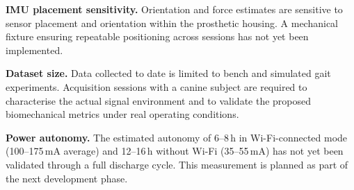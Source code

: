 \textbf{IMU placement sensitivity.}
Orientation and force estimates are sensitive to sensor placement and
orientation within the prosthetic housing.
A mechanical fixture ensuring repeatable positioning across sessions has
not yet been implemented.

\textbf{Dataset size.}
Data collected to date is limited to bench and simulated gait experiments.
Acquisition sessions with a canine subject are required to characterise
the actual signal environment and to validate the proposed biomechanical
metrics under real operating conditions.

\textbf{Power autonomy.}
The estimated autonomy of 6--8\,h in Wi-Fi-connected mode
(100--175\,mA average) and 12--16\,h without Wi-Fi
(35--55\,mA) has not yet been validated through a full discharge cycle.
This measurement is planned as part of the next development phase.
